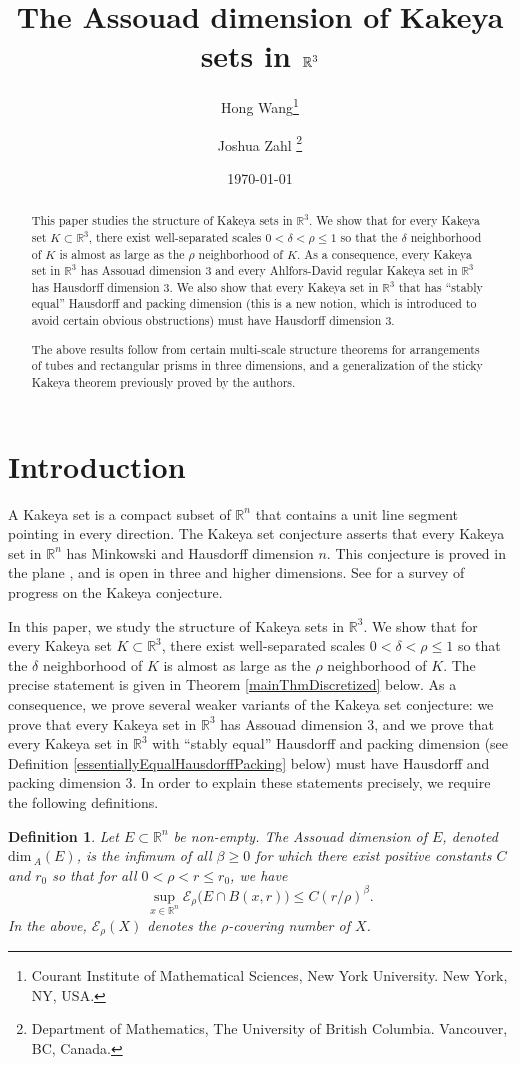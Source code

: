 \documentclass[letterpaper, reqno,11pt]{article}
\title{The Assouad dimension of Kakeya sets in $\RR^3$}
\author{Hong Wang\thanks{Courant Institute of Mathematical Sciences, New York University. New York, NY, USA.} \and Joshua Zahl \thanks{Department of Mathematics, The University of British Columbia. Vancouver, BC, Canada.}}
\date{\today}
\numberwithin{equation}{section}
\renewcommand{\dim}{\mathrm{dim}\,}
\newcommand{\RR}{\mathbb{R}}
\newcommand{\dimA}{\dim_{\! \!A}}
\numberwithin{thm}{section}
\newtheorem{defn}[thm]{Definition}
\theoremstyle{remark}
\begin{document}
\maketitle

\begin{abstract}
This paper studies the structure of Kakeya sets in $\mathbb{R}^3$. We show that for every Kakeya set $K\subset\mathbb{R}^3$, there exist well-separated scales $0<\delta<\rho\leq 1$ so that the $\delta$ neighborhood of $K$ is almost as large as the $\rho$ neighborhood of $K$. As a consequence, every Kakeya set in $\mathbb{R}^3$ has Assouad dimension 3 and every Ahlfors-David regular Kakeya set in $\mathbb{R}^3$ has Hausdorff dimension 3. We also show that every Kakeya set in $\mathbb{R}^3$ that has ``stably equal'' Hausdorff and packing dimension (this is a new notion, which is introduced to avoid certain obvious obstructions) must have Hausdorff dimension 3.  

The above results follow from certain multi-scale structure theorems for arrangements of tubes and rectangular prisms in three dimensions, and a generalization of  the sticky Kakeya theorem previously proved by the authors. 
\end{abstract}

\section{Introduction}\label{introSection}
A Kakeya set is a compact subset of $\RR^n$ that contains a unit line segment pointing in every direction. The Kakeya set conjecture asserts that every Kakeya set in $\RR^n$ has Minkowski and Hausdorff dimension $n$. This conjecture is proved in the plane \cite{Cor, Dav}, and is open in three and higher dimensions. See \cite{KT02, Wolff96} for a survey of progress on the Kakeya conjecture. 

In this paper, we study the structure of Kakeya sets in $\RR^3$. We show that for every Kakeya set $K\subset\mathbb{R}^3$, there exist well-separated scales $0<\delta<\rho\leq 1$ so that the $\delta$ neighborhood of $K$ is almost as large as the $\rho$ neighborhood of $K$. The precise statement is given in Theorem \ref{mainThmDiscretized} below. As a consequence, we prove several weaker variants of the Kakeya set conjecture: we prove that every Kakeya set in $\RR^3$ has Assouad dimension 3, and we prove that every Kakeya set in $\RR^3$ with ``stably equal'' Hausdorff and packing dimension (see Definition \ref{essentiallyEqualHausdorffPacking} below) must have Hausdorff and packing dimension 3. In order to explain these statements precisely, we require the following definitions.
\begin{defn}\label{defnAssouadDimension}
Let $E\subset\RR^n$ be non-empty. The \emph{Assouad dimension} of $E$, denoted $\dimA(E)$, is the infimum of all $\beta\geq 0$ for which there exist positive constants $C$ and $r_0$ so that for all $0<\rho<r\leq r_0$, we have
\[
\sup_{x\in \RR^n}\mathcal{E}_\rho \big(E \cap B(x,r)\big)\leq C(r/\rho)^\beta.
\]
In the above, $\mathcal{E}_\rho(X)$ denotes the $\rho$-covering number of $X$.
\end{defn}
\end{document}
